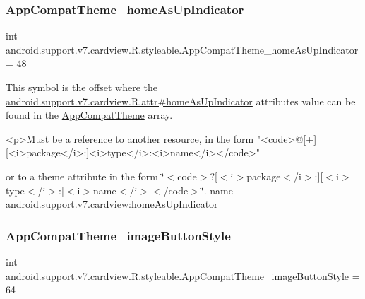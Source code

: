 \subsubsection{\texorpdfstring{App\+Compat\+Theme\+\_\+home\+As\+Up\+Indicator}{AppCompatTheme\_homeAsUpIndicator}}
{\footnotesize\ttfamily int android.\+support.\+v7.\+cardview.\+R.\+styleable.\+App\+Compat\+Theme\+\_\+home\+As\+Up\+Indicator = 48\hspace{0.3cm}{\ttfamily [static]}}

This symbol is the offset where the \hyperlink{classandroid_1_1support_1_1v7_1_1cardview_1_1R_1_1attr_a3d5f180614304935612a39e384a7c14a}{android.\+support.\+v7.\+cardview.\+R.\+attr\#home\+As\+Up\+Indicator} attribute\textquotesingle{}s value can be found in the \hyperlink{classandroid_1_1support_1_1v7_1_1cardview_1_1R_1_1styleable_a52e6f69f954ecc2622d72c0b4d298938}{App\+Compat\+Theme} array.

\begin{DoxyVerb}      <p>Must be a reference to another resource, in the form "<code>@[+][<i>package</i>:]<i>type</i>:<i>name</i></code>"
\end{DoxyVerb}
 or to a theme attribute in the form \char`\"{}$<$code$>$?\mbox{[}$<$i$>$package$<$/i$>$\+:\mbox{]}\mbox{[}$<$i$>$type$<$/i$>$\+:\mbox{]}$<$i$>$name$<$/i$>$$<$/code$>$\char`\"{}.  name android.\+support.\+v7.\+cardview\+:home\+As\+Up\+Indicator \mbox{\label{classandroid_1_1support_1_1v7_1_1cardview_1_1R_1_1styleable_a72b5ca7a1aac1855262c99759b66331b}} 
\subsubsection{\texorpdfstring{App\+Compat\+Theme\+\_\+image\+Button\+Style}{AppCompatTheme\_imageButtonStyle}}
{\footnotesize\ttfamily int android.\+support.\+v7.\+cardview.\+R.\+styleable.\+App\+Compat\+Theme\+\_\+image\+Button\+Style = 64\hspace{0.3cm}{\ttfamily [static]}}

